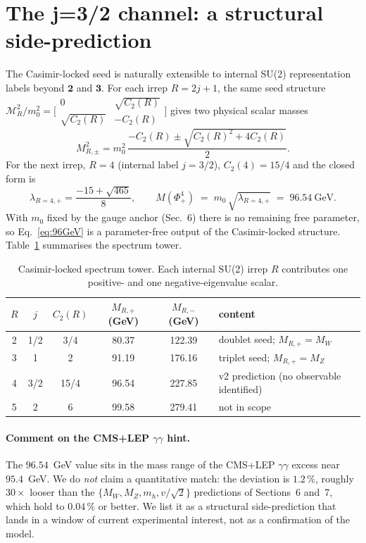 \documentclass[11pt,a4paper]{article}
\newcommand{\md}{\mathbf{2}}
\newcommand{\mt}{\mathbf{3}}
\newcommand{\Cas}{C_2}
\begin{document}
\section{The j=3/2 channel: a structural side-prediction}
\label{sec:j32}

The Casimir-locked seed is naturally extensible to internal SU(2)
representation labels beyond $\md$ and $\mt$. For each irrep
$R = 2j+1$, the same seed structure
$\mathcal M_R^2 / m_0^2 = \big[\begin{smallmatrix} 0 & \sqrt{\Cas(R)} \\ \sqrt{\Cas(R)} & -\Cas(R)\end{smallmatrix}\big]$
gives two physical scalar masses
\begin{equation}
  M_{R,\pm}^2 = m_0^2\,\frac{-\Cas(R) \pm \sqrt{\Cas(R)^2 + 4\Cas(R)}}{2}.
\end{equation}
For the next irrep, $R = 4$ (internal label $j = 3/2$), $\Cas(4) = 15/4$
and the closed form is
\begin{equation}
  \lambda_{R=4,+} = \frac{-15 + \sqrt{465}}{8},\qquad
  M(\Phi^4_+) \;=\; m_0\,\sqrt{\lambda_{R=4,+}}
  \;=\; 96.54~\text{GeV}.
\label{eq:96GeV}
\end{equation}
With $m_0$ fixed by the gauge anchor (Sec.~6) there is no remaining free
parameter, so Eq.~\eqref{eq:96GeV} is a parameter-free output of the
Casimir-locked structure. Table~\ref{tab:tower} summarises the spectrum
tower.

\begin{table}[ht]
\centering
\begin{tabular}{c c c c c l}
\toprule
$R$ & $j$ & $\Cas(R)$ & $M_{R,+}$ (GeV) & $M_{R,-}$ (GeV) & content \\
\midrule
2 & 1/2 & 3/4   & 80.37  & 122.39 & doublet seed; $M_{R,+} = M_W$ \\
3 & 1   & 2     & 91.19  & 176.16 & triplet seed; $M_{R,+} = M_Z$ \\
4 & 3/2 & 15/4  & 96.54  & 227.85 & v2 prediction (no observable identified) \\
5 & 2   & 6     & 99.58  & 279.41 & not in scope \\
\bottomrule
\end{tabular}
\caption{Casimir-locked spectrum tower. Each internal SU(2) irrep $R$
contributes one positive- and one negative-eigenvalue scalar.}
\label{tab:tower}
\end{table}

\paragraph{Comment on the CMS+LEP $\gamma\gamma$ hint.} The
$96.54$~GeV value sits in the mass range of the CMS+LEP $\gamma\gamma$
excess near $95.4$~GeV. We do \emph{not} claim a quantitative match:
the deviation is $1.2\,\%$, roughly $30\times$ looser than the
$\{M_W, M_Z, m_h, v/\sqrt{2}\}$ predictions of Sections~6 and~7, which
hold to $0.04\,\%$ or better. We list it as a structural side-prediction
that lands in a window of current experimental interest, not as a
confirmation of the model.
\end{document}
